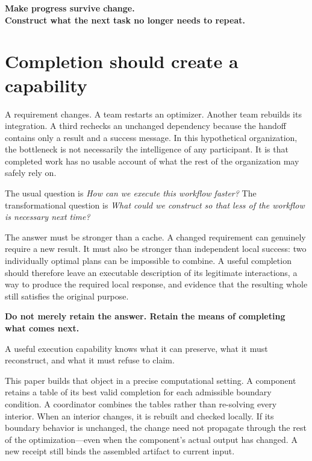 \documentclass[11pt,letterpaper]{article}
\theoremstyle{definition}\newtheorem{definition}[theorem]{Definition}
\theoremstyle{remark}\newtheorem{remark}[theorem]{Remark}
\begin{document}
\begin{thesis}
\centering\large\bfseries
Make progress survive change.\\[.25em]
\normalsize Construct what the next task no longer needs to repeat.
\end{thesis}
\clearpage

\section{Completion should create a capability}
A requirement changes. A team restarts an optimizer. Another team rebuilds its integration. A third rechecks an unchanged dependency because the handoff contains only a result and a success message. In this hypothetical organization, the bottleneck is not necessarily the intelligence of any participant. It is that completed work has no usable account of what the rest of the organization may safely rely on.

The usual question is \emph{How can we execute this workflow faster?} The transformational question is \emph{What could we construct so that less of the workflow is necessary next time?}

The answer must be stronger than a cache. A changed requirement can genuinely require a new result. It must also be stronger than independent local success: two individually optimal plans can be impossible to combine. A useful completion should therefore leave an executable description of its legitimate interactions, a way to produce the required local response, and evidence that the resulting whole still satisfies the original purpose.

\begin{thesis}
\textbf{Do not merely retain the answer. Retain the means of completing what comes next.}\par\smallskip
A useful execution capability knows what it can preserve, what it must reconstruct, and what it must refuse to claim.
\end{thesis}

This paper builds that object in a precise computational setting. A component retains a table of its best valid completion for each admissible boundary condition. A coordinator combines the tables rather than re-solving every interior. When an interior changes, it is rebuilt and checked locally. If its boundary behavior is unchanged, the change need not propagate through the rest of the optimization---even when the component's actual output has changed. A new receipt still binds the assembled artifact to current input.
\end{document}
